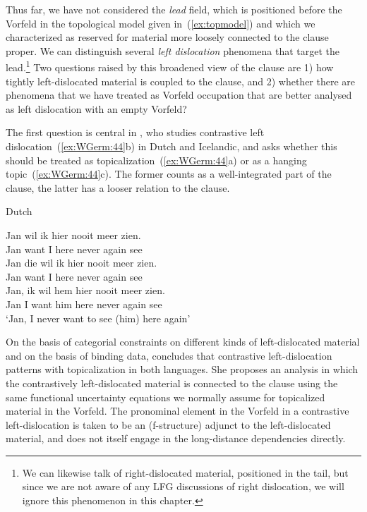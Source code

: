 \documentclass[output=paper,hidelinks]{langscibook}
\begin{document}
Thus far, we have not considered the \textit{lead} field, which is
positioned before the Vorfeld in the topological model
given in~(\ref{ex:topmodel}) and which we characterized as reserved for
material more loosely connected to the clause proper. We can
distinguish several \textit{left dislocation} phenomena that target
the lead.\footnote{We can likewise talk of right-dislocated
material, positioned in the tail, but since we are not aware of
any LFG discussions of right dislocation, we will ignore this phenomenon in this chapter.} Two questions raised by this broadened
view of the clause are 1) how tightly left-dislocated material is
coupled to the clause, and 2) whether there are phenomena that we have treated
as Vorfeld occupation that are better analysed as left dislocation
with an empty Vorfeld?

The first question is central in \citet{zaenen:1996}, who studies
contrastive left dislocation~(\ref{ex:WGerm:44}b) in Dutch and Icelandic, and
asks whether this should be treated as topicalization~(\ref{ex:WGerm:44}a) or
as a hanging topic~(\ref{ex:WGerm:44}c). The former counts as a well-integrated
part of the clause, the latter has a looser relation to the
clause.\largerpage[-1]\pagebreak

\begin{exe}
\ex\label{ex:WGerm:44} Dutch
  \begin{xlist} 
  \ex \gll Jan wil ik hier nooit meer zien.\\
           Jan want I here never again see\\
  \ex \gll Jan die wil ik hier nooit meer zien.\\
           Jan \DEM{} want I here never again see\\          
  \ex \gll Jan, ik wil hem hier nooit meer zien.\\
           Jan  I want him here never again see\\
  \glt `Jan, I never want to see (him) here again'
  \end{xlist}
\end{exe}
%
On the basis of categorial constraints on different kinds of
left-dislocated material and on the basis of binding data,
\citeauthor{zaenen:1996} concludes that contrastive left-dislocation
patterns with topicalization in both languages. She proposes an
analysis in which the contrastively left-dislocated material is
connected to the clause using the same functional uncertainty
equations we normally assume for topicalized material in the
Vorfeld. The pronominal element in the Vorfeld in a contrastive
left-dislocation is taken to be an (f-structure) adjunct to the
left-dislocated material, and does not itself engage in the
long-distance dependencies directly.
\end{document}
